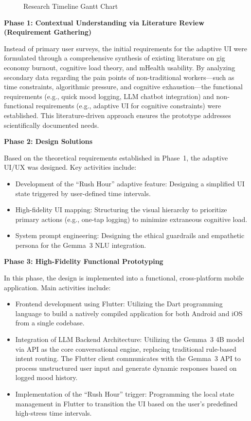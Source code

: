 \begin{figure}[h]
    \centering
    \caption{Research Timeline Gantt Chart}
    \label{fig:gantt}
\end{figure}

\textbf{Phase 1: Contextual Understanding via Literature Review (Requirement Gathering)}

Instead of primary user surveys, the initial requirements for the adaptive UI were formulated through a comprehensive synthesis of existing literature on gig economy burnout, cognitive load theory, and mHealth usability. By analyzing secondary data regarding the pain points of non-traditional workers---such as time constraints, algorithmic pressure, and cognitive exhaustion---the functional requirements (e.g., quick mood logging, LLM chatbot integration) and non-functional requirements (e.g., adaptive UI for cognitive constraints) were established. This literature-driven approach ensures the prototype addresses scientifically documented needs.

\textbf{Phase 2: Design Solutions}

Based on the theoretical requirements established in Phase~1, the adaptive UI/UX was designed. Key activities include:

\begin{itemize}
    \item Development of the ``Rush Hour'' adaptive feature: Designing a simplified UI state triggered by user-defined time intervals.
    \item High-fidelity UI mapping: Structuring the visual hierarchy to prioritize primary actions (e.g., one-tap logging) to minimize extraneous cognitive load.
    \item System prompt engineering: Designing the ethical guardrails and empathetic persona for the Gemma~3 NLU integration.
\end{itemize}

\textbf{Phase 3: High-Fidelity Functional Prototyping}

In this phase, the design is implemented into a functional, cross-platform mobile application. Main activities include:

\begin{itemize}
    \item Frontend development using Flutter: Utilizing the Dart programming language to build a natively compiled application for both Android and iOS from a single codebase.
    \item Integration of LLM Backend Architecture: Utilizing the Gemma~3 4B model via API as the core conversational engine, replacing traditional rule-based intent routing. The Flutter client communicates with the Gemma~3 API to process unstructured user input and generate dynamic responses based on logged mood history.
    \item Implementation of the ``Rush Hour'' trigger: Programming the local state management in Flutter to transition the UI based on the user's predefined high-stress time intervals.
\end{itemize}

